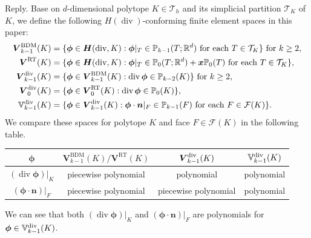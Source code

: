 \documentclass[10pt]{amsart}
\theoremstyle{definition}
\theoremstyle{remark}
\renewcommand{\div}{\operatorname{div}}
\begin{document}
\begin{enumerate}[1.]
\smallskip \noindent \textcolor[rgb]{1.00,0.00,0.00}{Reply.}
Base on $d$-dimensional polytope $K\in \mathcal T_h$ and its simplicial partition $\mathcal T_K$ of $K$, we define the following $H(\div)$-conforming finite element spaces in this paper:
\begin{align*}    
\boldsymbol{V}_{k-1}^{\mathrm{BDM}}(K)&=\{\boldsymbol{\phi}\in\boldsymbol{H}(\div, K): \boldsymbol{\phi}|_{T}\in \mathbb P_{k-1}(T;\mathbb R^d) \textrm{ for each } T\in\mathcal T_K\}\textrm{ for } k\geq2, \\
\boldsymbol{V}^{\mathrm{RT}}(K)&=\{\boldsymbol{\phi}\in\boldsymbol{H}(\div, K): \boldsymbol{\phi}|_{T}\in \mathbb P_{0}(T;\mathbb R^d)+\boldsymbol{x}\mathbb P_{0}(T) \textrm{ for each } T\in\mathcal T_K\}, \\
\boldsymbol{V}_{k-1}^{\rm div}(K)&=\{\boldsymbol{\phi}\in\boldsymbol{V}_{k-1}^{\mathrm{BDM}}(K): \div\boldsymbol{\phi}\in\mathbb P_{k-2}(K)\}\textrm{ for } k\geq2, \\
\boldsymbol{V}_{0}^{\rm div}(K)&=\{\boldsymbol{\phi}\in\boldsymbol{V}_{0}^{\mathrm{RT}}(K): \div\boldsymbol{\phi}\in\mathbb P_{0}(K)\},
\\
\mathbb{V}_{k-1}^{\rm div}(K)&=\{\boldsymbol{\phi}\in\boldsymbol{V}_{k-1}^{\rm div}(K): \boldsymbol{\phi}\cdot\boldsymbol{n}|_F\in\mathbb P_{k-1}(F) \textrm{ for each } F\in\mathcal F(K)\}.
\end{align*}
We compare these spaces for polytope $K$ and face $F\in\mathcal F(K)$ in the following table.
\begin{center}
\renewcommand\arraystretch{1.3}
\begin{tabular}[t]{|c|c|c|c|}
\hline
$\boldsymbol{\phi}$ & $\boldsymbol{V}_{k-1}^{\mathrm{BDM}}(K)/\boldsymbol{V}^{\mathrm{RT}}(K)$ & $\boldsymbol{V}_{k-1}^{\rm div}(K)$ & $\mathbb{V}_{k-1}^{\rm div}(K)$  \\
\hline
$(\div\boldsymbol{\phi})|_K$ & piecewise polynomial & polynomial & polynomial \\
\hline
$(\boldsymbol{\phi}\cdot\boldsymbol{n})|_F$ & piecewise polynomial & piecewise polynomial & polynomial \\
\hline
\end{tabular}
\end{center}
We can see that both $(\div\boldsymbol{\phi})|_K$ and $(\boldsymbol{\phi}\cdot\boldsymbol{n})|_F$ are polynomials for $\boldsymbol{\phi}\in\mathbb{V}_{k-1}^{\rm div}(K)$.


\end{enumerate}
\end{document}
